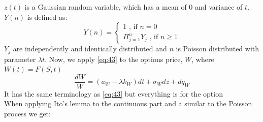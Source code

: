 \documentclass{article}
\begin{document}
$z(t)$ is a Gaussian random variable, which has a mean of 0 and variance of $t$. $Y(n)$ is defined as:
\begin{equation}
    Y(n) = \begin{cases} 1 \text{ , if } n=0 \\
    \Pi_{j=1}^{n} Y_{j} \text{ , if } n\geq1
    \end{cases}
\end{equation}
$Y_{j}$ are independently and identically distributed and $n$ is Poisson distributed with parameter $\lambda t$.
Now, we apply \ref{eq:43} to the options price, $W$, where $W(t) = F(S, t)$
\begin{equation}
    \frac{dW}{W} = (a_{W} - \lambda  k_{W}) dt + \sigma_{W} dz + dq_{W}
\end{equation}
It has the same terminology as \ref{eq:43} but everything is for the option \\ [2ex]
When applying Ito’s lemma to the continuous part and a similar to the Poisson process we get:
\end{document}
